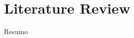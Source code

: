 \newcommand{\novathesis}{\emph{novathesis}}
\newcommand{\novathesisclass}{\texttt{novathesis.cls}}

\chapter{Literature Review}
\label{cha:StateofArt}


Resumo






